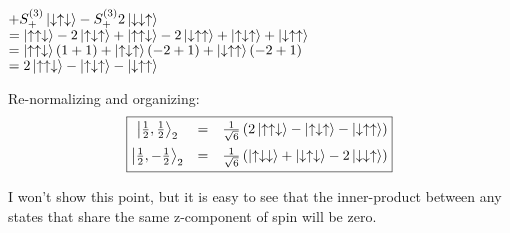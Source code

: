 \documentclass[12pt]{article}
\begin{document}
\begin{enumerate}[label=\alph*)]
\hspace*{5.7em}$+ S_+^{(3)}\ket{\downarrow\uparrow\downarrow} - S_+^{(3)}2\ket{\downarrow\downarrow\uparrow}$\vspace{0.5em}\\
\hspace*{2.7em}$= \ket{\uparrow\uparrow\downarrow}-2\ket{\uparrow\downarrow\uparrow}+\ket{\uparrow\uparrow\downarrow}-2\ket{\downarrow\uparrow\uparrow}+\ket{\uparrow\downarrow\uparrow}+\ket{\downarrow\uparrow\uparrow}$\vspace{0.5em}\\
\hspace*{2.7em}$=\ket{\uparrow\uparrow\downarrow}(1+1) + \ket{\uparrow\downarrow\uparrow}(-2+1) + \ket{\downarrow\uparrow\uparrow}(-2+1)$\vspace{0.5em}\\
\hspace*{2.7em}$=2\ket{\uparrow\uparrow\downarrow}-\ket{\uparrow\downarrow\uparrow}-\ket{\downarrow\uparrow\uparrow}$

Re-normalizing and organizing:
\[\boxed{\mqty{\ket{\frac{1}{2}, \frac{1}{2}}_2	& = & \frac{1}{\sqrt{6}}\left(2\ket{\uparrow\uparrow\downarrow}-\ket{\uparrow\downarrow\uparrow} - \ket{\downarrow\uparrow\uparrow}\right)\vspace{0.5em}\\ \ket{\frac{1}{2}, -\frac{1}{2}}_2 & = & \frac{1}{\sqrt{6}}\left(\ket{\uparrow\downarrow\downarrow}+\ket{\downarrow\uparrow\downarrow}-2\ket{\downarrow\downarrow\uparrow}\right)}}\]

I won't show this point, but it is easy to see that the inner-product between any states that share the same z-component of spin will be zero. 

\end{enumerate}

\newpage
\end{document}
